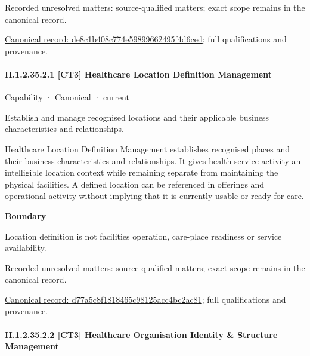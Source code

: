 {\small Recorded unresolved matters: source-qualified matters; exact scope remains in the canonical record.}\par
{\footnotesize \href{../../../../continuum/strategy/capability/de8c1b408c774e59899662495f4d6ced.md}{Canonical record: de8c1b408c774e59899662495f4d6ced}; full qualifications and provenance.}\par
\paragraph*{II.1.2.35.2.1 [CT3] Healthcare Location Definition Management}
\label{navigation:II.1.2.35.2.1}

\label{element:d77a5c8f1818465c98125acc4bc2ac81}
{\small Capability · Canonical · current}\par

Establish and manage recognised locations and their applicable business characteristics and relationships.



Healthcare Location Definition Management establishes recognised places and their business characteristics and relationships. It gives health-service activity an intelligible location context while remaining separate from maintaining the physical facilities. A defined location can be referenced in offerings and operational activity without implying that it is currently usable or ready for care.



\textbf{Boundary}



Location definition is not facilities operation, care-place readiness or service availability.


{\small Recorded unresolved matters: source-qualified matters; exact scope remains in the canonical record.}\par
{\footnotesize \href{../../../../continuum/strategy/capability/d77a5c8f1818465c98125acc4bc2ac81.md}{Canonical record: d77a5c8f1818465c98125acc4bc2ac81}; full qualifications and provenance.}\par
\paragraph*{II.1.2.35.2.2 [CT3] Healthcare Organisation Identity \& Structure Management}
\label{navigation:II.1.2.35.2.2}

